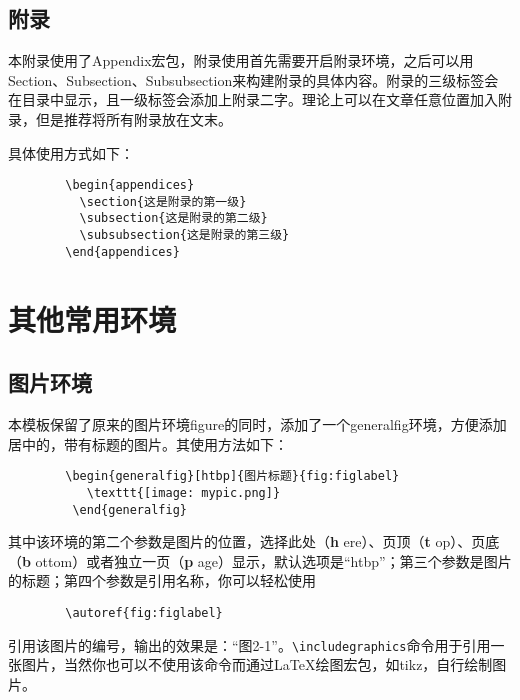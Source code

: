 \documentclass[UTF8,sub3section]{ctexart}
\begin{document}
	\subsection{附录}
	本附录使用了Appendix宏包，附录使用首先需要开启附录环境，之后可以用Section、Subsection、Subsubsection来构建附录的具体内容。附录的三级标签会在目录中显示，且一级标签会添加上附录二字。理论上可以在文章任意位置加入附录，但是推荐将所有附录放在文末。
	
	具体使用方式如下：
	\begin{verbatim}
		\begin{appendices}
		  \section{这是附录的第一级}
		  \subsection{这是附录的第二级}
		  \subsubsection{这是附录的第三级}
		\end{appendices}
	\end{verbatim}
	
	\section{其他常用环境}
	\subsection{图片环境}
	本模板保留了原来的图片环境figure的同时，添加了一个generalfig环境，方便添加居中的，带有标题的图片。其使用方法如下：
	\begin{verbatim}
		\begin{generalfig}[htbp]{图片标题}{fig:figlabel}
		   \texttt{[image: mypic.png]}
		 \end{generalfig}
	\end{verbatim}
	其中该环境的第二个参数是图片的位置，选择此处（{\bfseries h} ere）、页顶（{\bfseries t} op）、页底（{\bfseries b} ottom）或者独立一页（{\bfseries p} age）显示\textsuperscript{\cite[\S 5.3]{9787121202087}}，默认选项是“htbp”；第三个参数是图片的标题；第四个参数是引用名称，你可以轻松使用
	\begin{verbatim}
		\autoref{fig:figlabel}
	\end{verbatim}
	引用该图片的编号，输出的效果是：“图2-1”。\verb|\includegraphics|命令用于引用一张图片，当然你也可以不使用该命令而通过\LaTeX 绘图宏包，如tikz，自行绘制图片。
	
\end{document}
